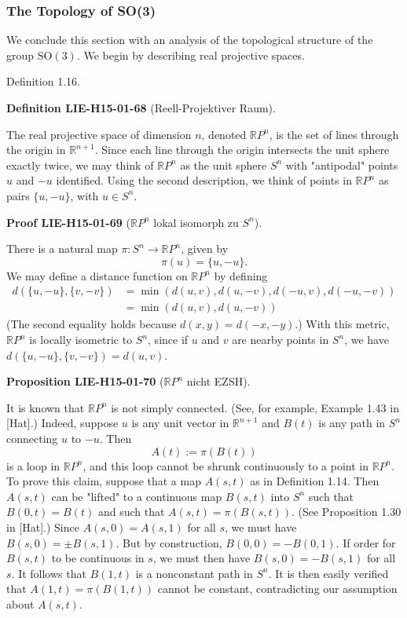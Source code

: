 \documentclass[10pt, letterpaper]{article}
\newcommand{\R}{\mathbb{R}}
\newcommand{\CustomHeading}[3]{%
  \par\medskip\noindent%
  \textbf{#1 #2} \textnormal{(#3)}.\enskip%
}
\newenvironment{DEF}[2]{\begin{unitbox}\CustomHeading{Definition}{#1}{#2}}{\end{unitbox}}
\newenvironment{PROP}[2]{\begin{unitbox}\CustomHeading{Proposition}{#1}{#2}}{\end{unitbox}}
\newenvironment{PROOF}[2]{\begin{unitbox}\CustomHeading{Proof}{#1}{#2}}{\end{unitbox}}
\begin{document}
\subsubsection*{The Topology of SO(3)}


We conclude this section with an analysis of the topological structure of the group $\mathrm{SO}(3)$. We begin by describing real projective spaces.


Definition 1.16. 


\begin{DEF}{LIE-H15-01-68}{Reell-Projektiver Raum}
The real projective space of dimension $n$, denoted $\mathbb{R} P^{n}$, is the set of lines through the origin in $\mathbb{R}^{n+1}$. Since each line through the origin intersects the unit sphere exactly twice, we may think of $\mathbb{R} P^{n}$ as the unit sphere $S^{n}$ with "antipodal" points $u$ and $-u$ identified. Using the second description, we think of points in $\mathbb{R} P^{n}$ as pairs $\{u,-u\}$, with $u \in S^{n}$.
\end{DEF}


\begin{PROOF}{LIE-H15-01-69}{$\R P^n$ lokal isomorph zu $S^n$}
There is a natural map $\pi: S^{n} \rightarrow \mathbb{R} P^{n}$, given by
$$
\pi(u)=\{u,-u\} .
$$
We may define a distance function on $\mathbb{R} P^{n}$ by defining
$$
\begin{aligned}
d(\{u,-u\},\{v,-v\}) & =\min (d(u, v), d(u,-v), d(-u, v), d(-u,-v)) \\
& =\min (d(u, v), d(u,-v))
\end{aligned}
$$
(The second equality holds because $d(x, y)=d(-x,-y)$.) With this metric, $\mathbb{R} P^{n}$ is locally isometric to $S^{n}$, since if $u$ and $v$ are nearby points in $S^{n}$, we have $d(\{u,-u\},\{v,-v\})=d(u, v)$.
\end{PROOF}


\begin{PROP}{LIE-H15-01-70}{$\R P^n$ nicht EZSH}
It is known that $\mathbb{R} P^{n}$ is not simply connected. (See, for example, Example 1.43 in [Hat].) Indeed, suppose $u$ is any unit vector in $\mathbb{R}^{n+1}$ and $B(t)$ is any path in $S^{n}$ connecting $u$ to $-u$. Then
$$
A(t):=\pi(B(t))
$$
is a loop in $\mathbb{R} P^{n}$, and this loop cannot be shrunk continuously to a point in $\mathbb{R} P^{n}$. To prove this claim, suppose that a map $A(s, t)$ as in Definition 1.14. Then $A(s, t)$ can be "lifted" to a continuous map $B(s, t)$ into $S^{n}$ such that $B(0, t)=B(t)$ and such that $A(s, t)=\pi(B(s, t))$. (See Proposition 1.30 in [Hat].) Since $A(s, 0)= A(s, 1)$ for all $s$, we must have $B(s, 0)= \pm B(s, 1)$. But by construction, $B(0,0)= -B(0,1)$. If order for $B(s, t)$ to be continuous in $s$, we must then have $B(s, 0)= -B(s, 1)$ for all $s$. It follows that $B(1, t)$ is a nonconstant path in $S^{n}$. It is then easily verified that $A(1, t)=\pi(B(1, t))$ cannot be constant, contradicting our assumption about $A(s, t)$.
\end{PROP}
\end{document}
